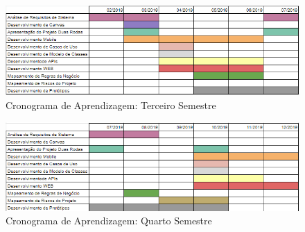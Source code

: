 \begin{figure}[htb]
	\caption{\label{cron-3-semestre}Cronograma de Aprendizagem: Terceiro Semestre}
	\begin{center}
		\includegraphics[scale=0.90]{./Figuras/cronograma-3-semestre.png}
	\end{center}
\end{figure}


\begin{figure}[htb]
	\caption{\label{cron-4-semestre}Cronograma de Aprendizagem: Quarto Semestre}
	\begin{center}
		\includegraphics[scale=0.90]{./Figuras/cronograma-4-semestre.png}
	\end{center}
\end{figure}